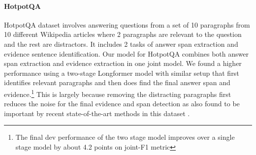 \documentclass[11pt,a4paper]{article}
\newcommand{\model}{Longformer\xspace}
\begin{document}
\paragraph{HotpotQA}
HotpotQA dataset involves answering questions from a set of 10 paragraphs from 10 different Wikipedia articles where 2 paragraphs are relevant to the question and the rest are distractors. It includes 2 tasks of answer span extraction and evidence sentence identification.
Our model for HotpotQA combines both answer span extraction and evidence extraction in one joint model. 
We found a higher performance using a two-stage \model model with similar setup that first identifies relevant paragraphs and then does find the final answer span and evidence.\footnote{The final dev performance of the two stage model improves over a single stage model by about 4.2 points on joint-F1 metric}  This is largely because removing the distracting paragraphs first reduces the noise for the final evidence and span detection as also found to be important by recent state-of-the-art methods in this dataset \cite{hotpotqasota}.
\end{document}
